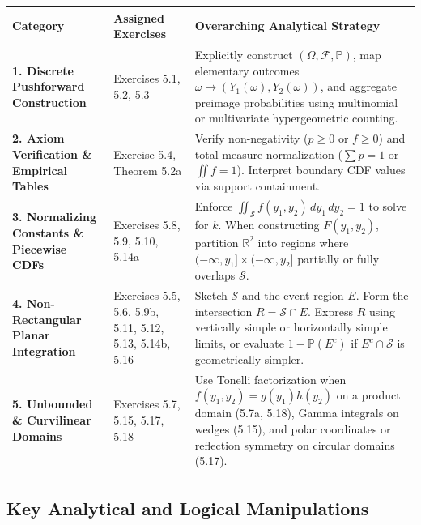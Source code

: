\documentclass[11pt, letterpaper]{article}
\theoremstyle{definition}
\theoremstyle{remark}
\begin{document}
\renewcommand{\arraystretch}{1.5}
\begin{tabularx}{\textwidth}{l X X}
\toprule
\textbf{Category} & \textbf{Assigned Exercises} & \textbf{Overarching Analytical Strategy} \\
\midrule
\textbf{1. Discrete Pushforward Construction} & Exercises 5.1, 5.2, 5.3 & Explicitly construct $(\Omega, \mathcal{F}, \mathbb{P})$, map elementary outcomes $\omega \mapsto (Y_1(\omega), Y_2(\omega))$, and aggregate preimage probabilities using multinomial or multivariate hypergeometric counting. \\
\addlinespace[4pt]
\textbf{2. Axiom Verification \& Empirical Tables} & Exercise 5.4, Theorem 5.2a & Verify non-negativity ($p \ge 0$ or $f \ge 0$) and total measure normalization ($\sum p = 1$ or $\iint f = 1$). Interpret boundary CDF values via support containment. \\
\addlinespace[4pt]
\textbf{3. Normalizing Constants \& Piecewise CDFs} & Exercises 5.8, 5.9, 5.10, 5.14a & Enforce $\iint_{\mathcal{S}} f(y_1, y_2) \, dy_1 \, dy_2 = 1$ to solve for $k$. When constructing $F(y_1, y_2)$, partition $\mathbb{R}^2$ into regions where $(-\infty, y_1] \times (-\infty, y_2]$ partially or fully overlaps $\mathcal{S}$. \\
\addlinespace[4pt]
\textbf{4. Non-Rectangular Planar Integration} & Exercises 5.5, 5.6, 5.9b, 5.11, 5.12, 5.13, 5.14b, 5.16 & Sketch $\mathcal{S}$ and the event region $E$. Form the intersection $R = \mathcal{S} \cap E$. Express $R$ using vertically simple or horizontally simple limits, or evaluate $1 - \mathbb{P}(E^c)$ if $E^c \cap \mathcal{S}$ is geometrically simpler. \\
\addlinespace[4pt]
\textbf{5. Unbounded \& Curvilinear Domains} & Exercises 5.7, 5.15, 5.17, 5.18 & Use Tonelli factorization when $f(y_1, y_2) = g(y_1)h(y_2)$ on a product domain (5.7a, 5.18), Gamma integrals on wedges (5.15), and polar coordinates or reflection symmetry on circular domains (5.17). \\
\bottomrule
\end{tabularx}

\subsection{Key Analytical and Logical Manipulations}
\end{document}
